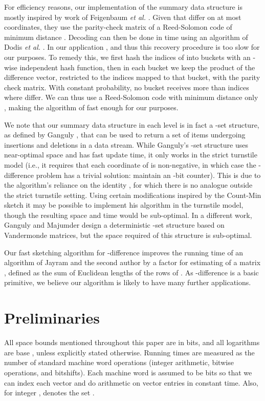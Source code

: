 \documentclass[letterpaper,11pt]{article}
\newcommand{\SectionName}[1]{\label{sec:#1}}
\begin{document}
For efficiency reasons, our implementation of the summary data
structure is mostly inspired by work of Feigenbaum {\it et al.}
\cite{FIMNSW06}. Given that
 differ on at most  coordinates, they use the parity-check
matrix of a Reed-Solomon code of minimum distance .  Decoding
can then be done in time  using
an algorithm of Dodis {\it et al.} \cite{DORS08}. In our
application , and thus this recovery procedure is too slow for our
purposes.  To remedy this, we first hash the indices of 
into  buckets with an
-wise independent hash function, then in each bucket
we keep the product of the difference vector, restricted to the
indices mapped to that bucket, with the parity check matrix.
With constant probability, no bucket receives more than
 indices where  differ.
We can thus use a Reed-Solomon code
with minimum distance only , making the algorithm of
\cite{DORS08} fast enough for our purposes.

We note that our summary data structure in each level is in fact a
-set structure, as defined by Ganguly \cite{Ganguly07}, that can be
used
to return a set of  items undergoing insertions and deletions in a
data stream. While Ganguly's -set structure uses near-optimal space
and has fast update time, it only works in the strict turnstile model
(i.e., it requires that each coordinate of  is non-negative,
in which case the -difference problem has a trivial solution:
maintain an -bit counter). This is due to the algorithm's
reliance on the identity , for which there is no analogue
outside the strict turnstile setting. Using certain modifications
inspired by the Count-Min sketch \cite{cm05} it may be possible
to implement his algorithm in the turnstile model, though the resulting
space and time would be sub-optimal. In a different work, Ganguly
and Majumder
\cite{GM06} design a deterministic -set structure based on
Vandermonde matrices, but the space required of this structure is
sub-optimal.

Our fast sketching algorithm for -difference improves the running
time of an algorithm of Jayram and the second author \cite{jw08} 
by a  factor for
estimating  of a matrix , defined as the
sum of Euclidean lengths of the rows of . As -difference is a basic
primitive, we believe our algorithm is likely to have many further
applications.

\section{Preliminaries}\SectionName{prelim}
All space bounds mentioned throughout this paper are in bits, and all
logarithms are base ,  unless
explicitly stated otherwise. Running times are measured as the number
of standard machine word operations (integer arithmetic, bitwise
operations, and bitshifts). Each machine word is assumed to be
 bits so that we can index each vector and do
arithmetic on vector entries in constant time. Also, for integer ,
 denotes the set .
\end{document}
